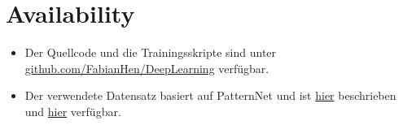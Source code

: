 \section*{Availability}
\label{sec:availability}
\begin{itemize}
    \item Der Quellcode und die Trainingsskripte sind unter
          \href{https://github.com/FabianHen/DeepLearning}{github.com/FabianHen/DeepLearning}
          verf\"ugbar.
    \item Der verwendete Datensatz basiert auf PatternNet und ist \href{https://doi.org/10.1016/j.isprsjprs.2018.01.004}{hier}
          beschrieben und \href{https://huggingface.co/datasets/blanchon/PatternNet}{hier} verfügbar.
\end{itemize}